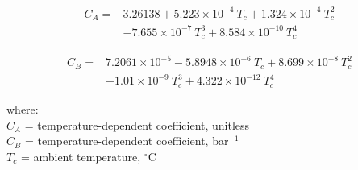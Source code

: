 \begin{equation}
\label{eq:chena}
	\begin{split}
		C_A = & 3.26138 +5.223\times 10^{-4}\: T_c +1.324\times 10^{-4}\: T_c^2\\
		       & -7.655\times 10^{-7}\: T_c^3 +8.584\times 10^{-10}\: T_c^4
	\end{split}
\end{equation}

\begin{equation}
\label{eq:chenb}
	\begin{split}
		C_B = & 7.2061\times 10^{-5} -5.8948\times 10^{-6}\: T_c +8.699\times 10^{-8}\: T_c^2 \\
		      & -1.01\times 10^{-9}\: T_c^3 +4.322\times 10^{-12}\: T_c^4
	\end{split}
\end{equation}

\noindent where: \\
\indent $C_A$ = temperature-dependent coefficient, unitless\\
\indent $C_B$ = temperature-dependent coefficient, bar$^{-1}$\\
\indent $T_c$ = ambient temperature, $^{\circ}$C\\

